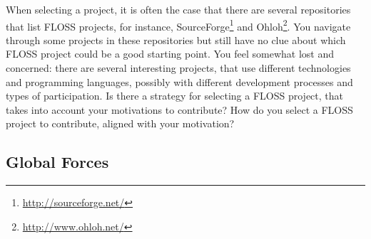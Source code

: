 \documentclass[12pt]{article}
\begin{document}
When selecting a project, it is often the case that 
there are several repositories that list FLOSS projects, for instance, 
SourceForge\footnote{\url{http://sourceforge.net/}} and Ohloh\footnote{\url{http://www.ohloh.net/}}.
You navigate through some projects in these repositories but still have no
clue about which FLOSS project could be a good starting point.
You feel somewhat lost and concerned: there are several interesting projects, 
that use different technologies and programming languages, possibly with different 
development processes and types of participation. 
Is  there a strategy for selecting a FLOSS project, 
that takes into account your motivations to contribute?
How do you select a FLOSS project to contribute, 
aligned with your motivation?   %

\subsection{Global Forces}
\end{document}
